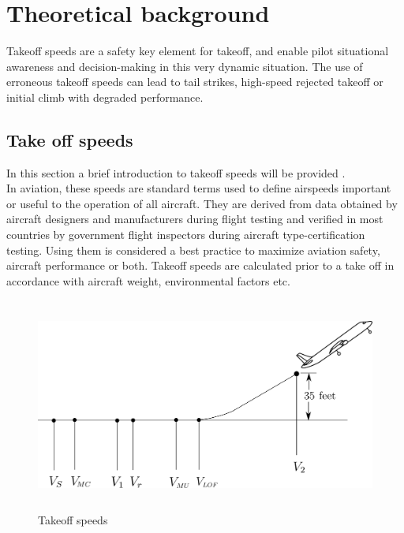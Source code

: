 
\chapter{Theoretical background}
\label{ch:ch2} %

Takeoff speeds are a safety key element for takeoff, and enable pilot situational
awareness and decision-making in this very dynamic situation. The use of erroneous
takeoff speeds can lead to tail strikes, high-speed rejected takeoff or initial climb with
degraded performance. 


\section{Take off speeds}
In this section a brief introduction to takeoff speeds will be provided \cite{Airbus:Flight:Notes}. \\
In aviation, these speeds are standard terms used to define airspeeds important or useful to the operation of all aircraft. They are derived from data obtained by aircraft designers and manufacturers during flight testing and verified in most countries by government flight inspectors during aircraft type-certification testing. Using them is considered a best practice to maximize aviation safety, aircraft performance or both. Takeoff speeds are calculated prior to a take off in accordance with aircraft weight, environmental factors etc.

\begin{figure}[htbp]
	\centering
	\includegraphics[height=7cm, keepaspectratio ]{Immagini/Capitolo2/takeoffSpeeds} 
	\caption{Takeoff speeds} %
	\label{fig:figura2_4} %
\end{figure}

